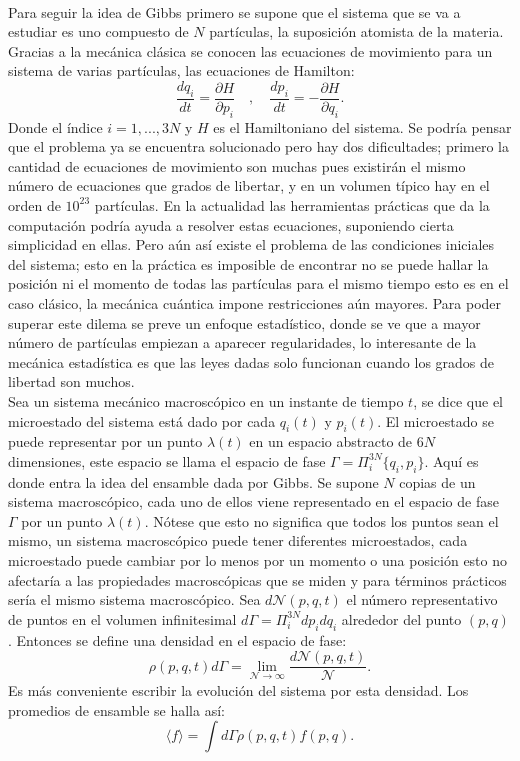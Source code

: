 \\
Para seguir la idea de Gibbs primero se supone que el sistema que se va a estudiar es uno compuesto de $N$ partículas, la suposición atomista de la materia. Gracias a la mecánica clásica se conocen las ecuaciones de movimiento para un sistema de varias partículas, las ecuaciones de Hamilton:
\begin{equation} \label{Hamilton}
\frac{dq_{i}}{dt}= \frac{\partial H}{\partial p_{i}} \quad , \quad \frac{d p_{i}}{dt} =-\frac{\partial H}{\partial q_{i}}.
\end{equation}
Donde el índice $i=1,...,3N$ y $H$ es el Hamiltoniano del sistema. Se podría pensar que el problema ya se encuentra solucionado pero hay dos dificultades; primero la cantidad de ecuaciones de movimiento son muchas pues existirán el mismo número de ecuaciones que grados de libertar, y en un volumen típico hay en el orden de $10^{23}$ partículas. En la actualidad las herramientas prácticas que da la computación podría ayuda a resolver estas ecuaciones, suponiendo cierta simplicidad en ellas. Pero aún así existe el problema de las condiciones iniciales del sistema; esto en la práctica es imposible de encontrar no se puede hallar la posición ni el momento de todas las partículas para el mismo tiempo esto es en el caso clásico, la mecánica cuántica impone restricciones aún mayores. Para poder superar este dilema se preve un enfoque estadístico, donde se ve que a mayor número de partículas empiezan a aparecer regularidades, lo interesante de la mecánica estadística es que las leyes dadas solo funcionan cuando los grados de libertad son muchos.
\\
Sea un sistema mecánico macroscópico en un instante de tiempo $t$,  se dice que el microestado del sistema está dado por cada $q_{i}(t)$ y $p_{i}(t)$. El microestado se puede representar por un punto $\lambda(t)$ en un espacio  abstracto de $6N$ dimensiones, este espacio se llama el espacio de fase $\Gamma = \Pi^{3N}_{i} \{q_{i}, p_{i} \}$.
Aquí es donde entra la idea del ensamble dada por Gibbs. Se supone $N$ copias de un sistema macroscópico, cada uno de ellos viene representado en el espacio de fase $\Gamma$ por un punto $\lambda(t)$. Nótese que esto no significa  que todos los puntos sean el mismo, un sistema macroscópico puede tener diferentes microestados, cada microestado puede cambiar por lo menos por un momento o una posición esto no afectaría a las propiedades macroscópicas que se miden y para términos prácticos sería el mismo sistema macroscópico. Sea $d\mathcal{N}(p,q,t)$ el número representativo de puntos en el volumen infinitesimal $d\Gamma = \Pi^{3N}_{i}dp_{i}dq_{i}$ alrededor del punto $(p,q)$. Entonces se define una densidad en el espacio de fase:
\begin{equation}
\rho(p,q,t)d\Gamma= \lim_{\mathcal{N} \to \infty} \frac{d\mathcal{N}(p,q,t)}{\mathcal{N}}.
\end{equation}
Es más conveniente escribir la evolución del sistema por esta densidad. Los promedios de ensamble se halla así:
\begin{equation}
\langle f \rangle = \int d\Gamma \rho(p,q,t) f(p,q).
\end{equation}

